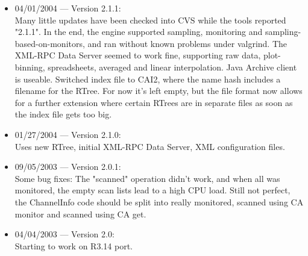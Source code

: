 \begin{itemize}
\item 04/01/2004 --- Version 2.1.1:\\
Many little updates have been checked into CVS
while the tools reported "2.1.1".
In the end, the engine supported sampling, monitoring
and sampling-based-on-monitors, and ran without known problems
under valgrind.
The XML-RPC Data Server seemed to work fine, supporting
raw data, plot-binning, spreadsheets, averaged and linear interpolation.
Java Archive client is useable.
Switched index file to CAI2, where the name hash includes a filename
for the RTree. For now it's left empty, but the file format now
allows for a further extension where certain RTrees are in separate
files as soon as the index file gets too big.

\item 01/27/2004 --- Version 2.1.0:\\
Uses new RTree, initial XML-RPC Data Server, XML configuration files.

\item 09/05/2003 --- Version 2.0.1:\\
Some bug fixes:
The  "scanned"  operation didn't work, and when all was monitored,
the  empty  scan lists lead to a high CPU load. Still not perfect,
the  ChannelInfo  code  should  be  split  into  really monitored,
scanned using CA monitor and scanned using CA get.

\item 04/04/2003 --- Version 2.0:\\
Starting to work on R3.14 port.
\end{itemize}
